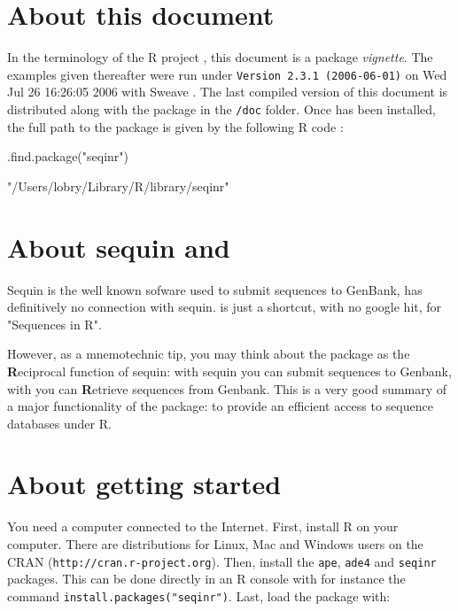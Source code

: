 \documentclass{article}
\begin{document}
\section{About this document}

In the terminology of the R project \cite{R, RfromR}, this document is a package \emph{vignette}.
The examples given thereafter were run under \texttt{Version 2.3.1 (2006-06-01)}
on Wed Jul 26 16:26:05 2006 with Sweave \cite{Sweave}.
The last compiled version of this document is distributed along with the \seqinr{}
package in the \texttt{/doc} folder. Once \seqinr{} has been installed, the
full path to the package is given by the following R code :

\begin{Schunk}
\begin{Sinput}
 .find.package("seqinr")
\end{Sinput}
\begin{Soutput}
[1] "/Users/lobry/Library/R/library/seqinr"
\end{Soutput}
\end{Schunk}


\section{About sequin and \seqinr{}}

Sequin is the well known sofware used to submit sequences to GenBank, \seqinr{}
has definitively no connection with sequin. \seqinr{} is just a shortcut, with
no google hit, for "Sequences in R".

However, as a mnemotechnic tip, you may think about the \seqinr{} package
as the {\bf{R}}eciprocal function of sequin: with sequin you can submit sequences
to Genbank, with \seqinr{} you can {\bf{R}}etrieve sequences from Genbank. This is
a very good summary of a major functionality of the \seqinr{} package: to
provide an efficient access to sequence databases under R.

\section{About getting started}

You need a computer connected to the Internet. First, install R on your computer.
There are distributions for Linux, Mac and Windows users
on the CRAN (\texttt{http://cran.r-project.org}). Then, install the \texttt{ape}, 
\texttt{ade4} and \texttt{seqinr} packages. This can be done directly in an R console
with for instance the command \texttt{install.packages("seqinr")}. 
Last, load the \seqinr{} package with:
\end{document}
